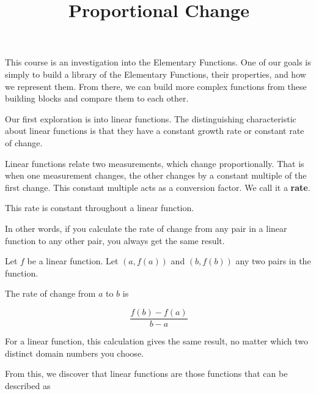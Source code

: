 \documentclass{ximera}
\title{Proportional Change}
\begin{document}
\begin{abstract}
\end{abstract}
\maketitle





This course is an investigation into the Elementary Functions.  One of our goals is simply to build a library of the Elementary Functions, their properties, and how we represent them.  From there, we can build more complex functions from these building blocks and compare them to each other. 



Our first exploration is into linear functions. The distinguishing characteristic about linear functions is that they have a constant growth rate or constant rate of change.  




Linear functions relate two measurements, which change proportionally.  That is when one measurement changes, the other changes by a constant multiple of the first change.  This constant multiple acts as a conversion factor.  We call it a \textbf{\textcolor{purple!85!blue}{rate}}. 



This rate is constant throughout a linear function.





In other words, if you calculate the rate of change from any pair in a linear function to any other pair, you always get the same result.

Let $f$ be a linear function.  Let $(a, f(a))$ and $(b, f(b))$ any two pairs in the function.

The rate of change from $a$ to $b$ is 

\[
\frac{f(b) - f(a)}{b-a}
\]


For a linear function, this calculation gives the same result, no matter which two distinct domain numbers you choose.













From this, we discover that linear functions are those functions that can be described as
\end{document}
